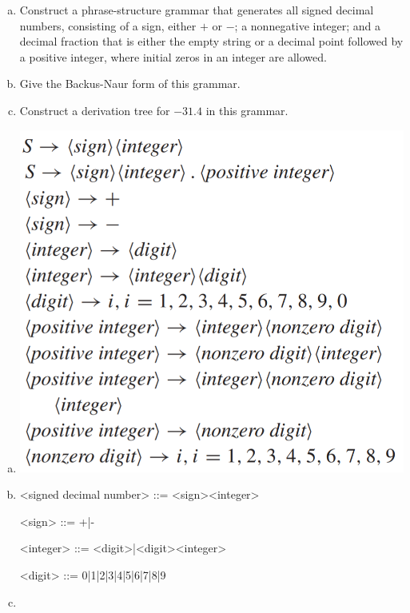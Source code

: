 \documentclass[../main.tex]{subfiles}
\begin{document}
\begin{enumerate}[a)]
	\item Construct a phrase-structure grammar that generates all signed decimal numbers,
		consisting of a sign, either $+$ or $-$;
		a nonnegative integer;
		and a decimal fraction that is either the empty string or a decimal point followed by a positive integer,
		where initial zeros in an integer are allowed.
	\item Give the Backus-Naur form of this grammar.
	\item Construct a derivation tree for $-31.4$ in this grammar.
\end{enumerate}

\solution
\begin{enumerate}[a)]
	\item \includegraphics[width=\textwidth]{img/29aA.png}
	\item 
		\begin{grammar}
			<signed decimal number> ::= <sign><integer>

			<sign> ::= +|-

			<integer> ::= <digit>|<digit><integer>

			<digit> ::= 0|1|2|3|4|5|6|7|8|9
		\end{grammar}
	\item 
\end{enumerate}
\end{document}
